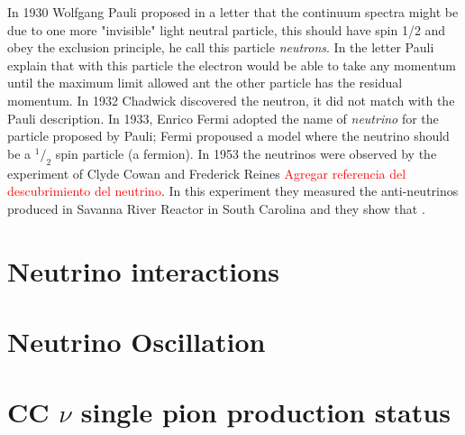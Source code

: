 In 1930 Wolfgang Pauli \cite{NeutrinoHistory} proposed in a letter that the continuum spectra might be due to one more "invisible" light neutral particle, this should have spin 1/2 and obey the exclusion principle, he call this particle \textit{neutrons}. In the letter Pauli explain that with this particle the electron would be able to take any momentum until the maximum limit allowed ant the other particle has the residual momentum. In 1932 Chadwick discovered the neutron, it did not match with the Pauli description. In 1933, Enrico Fermi adopted the name of \textit{neutrino} for the particle proposed by Pauli; Fermi propoused a model where the neutrino should be a $^1/_2$ spin particle (a fermion). In 1953 the neutrinos were observed by the experiment of Clyde Cowan and Frederick Reines \textcolor{red}{Agregar referencia del descubrimiento del neutrino}. In this experiment they measured the anti-neutrinos produced in Savanna River Reactor in South Carolina and they show that .

\section{Neutrino interactions}
\label{Cap:Int:NuInteractions}

\section{Neutrino Oscillation}
\label{Cap:Int:NuOscillation}

\section{CC $\nu$ single pion production status}
\label{Cap:Int:Motivation}


 

